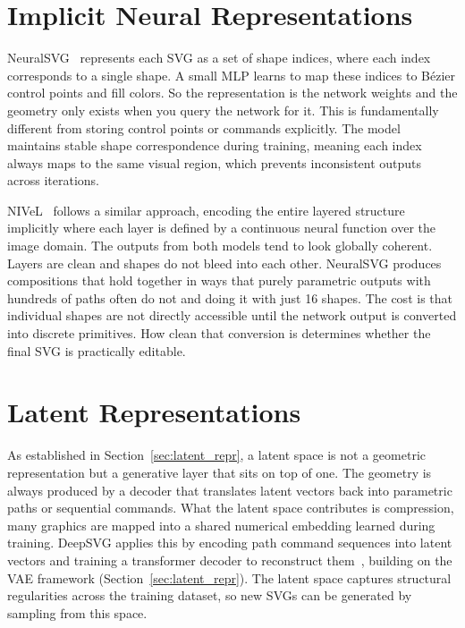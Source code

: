 \section{Implicit Neural Representations}
\label{sec:implicit}

NeuralSVG~\cite{polaczekNeuralSVGImplicitRepresentation2025} represents each SVG as a set of shape indices, 
where each index corresponds to a single shape. A small MLP learns to map these indices to B\'{e}zier control points and fill colors. 
So the representation is the network weights and the geometry only exists when you query the network for it.
This is fundamentally different from storing control points or commands explicitly. 
The model maintains stable shape correspondence during training, meaning each index always maps to the same visual region, 
which prevents inconsistent outputs across iterations. 

NIVeL~\cite{thamizharasanNIVeLNeuralImplicit2024} follows a similar approach, 
encoding the entire layered structure implicitly where each layer is defined by a continuous neural function over the image domain.
The outputs from both models tend to look globally coherent. Layers are clean and shapes do not bleed into each other. 
NeuralSVG produces compositions that hold together in ways that purely parametric outputs with hundreds 
of paths often do not and doing it with just 16 shapes. The cost is that individual shapes are not directly accessible until the network output is 
converted into discrete primitives. How clean that conversion is determines whether the final SVG is practically editable.

\section{Latent Representations}
\label{sec:latent}

As established in Section~\ref{sec:latent_repr}, a latent space is not a geometric representation but a generative layer 
that sits on top of one. The geometry is always produced by a decoder that translates latent vectors back into parametric paths 
or sequential commands. What the latent space contributes is compression, many graphics are mapped into a shared numerical embedding 
learned during training. DeepSVG applies this by encoding path command sequences into latent vectors and training a transformer 
decoder to reconstruct them~\cite{carlierDeepSVGHierarchicalGenerative2020}, building on the VAE framework (Section~\ref{sec:latent_repr}). 
The latent space captures structural regularities across the training dataset, so new SVGs can be generated by sampling from this space.

